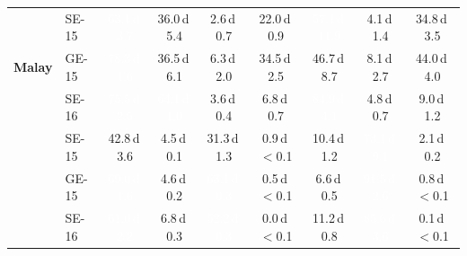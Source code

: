 \begin{table}[!htb]
\begin{tabular}{ll cccc @{\hspace{6pt}} ccc}
\multirow{3}{*}{\textbf{Malay}} & SE-15 & \cellcolor[HTML]{4090C5}\textcolor{white}{63.1\,{\tiny\textsf{d}\,}3.7} & \cellcolor[HTML]{A3CCE3}36.0\,{\tiny\textsf{d}\,}5.4 & \cellcolor[HTML]{F2F8FD}2.6\,{\tiny\textsf{d}\,}0.7 & \cellcolor[HTML]{CCDFF1}22.0\,{\tiny\textsf{d}\,}0.9 & \cellcolor[HTML]{539ECD}\textcolor{white}{57.1\,{\tiny\textsf{d}\,}11.9} & \cellcolor[HTML]{EFF6FC}4.1\,{\tiny\textsf{d}\,}1.4 & \cellcolor[HTML]{A6CEE4}34.8\,{\tiny\textsf{d}\,}3.5 \\
 & GE-15 & \cellcolor[HTML]{1A68AE}\textcolor{white}{78.3\,{\tiny\textsf{d}\,}1.6} & \cellcolor[HTML]{A1CBE2}36.5\,{\tiny\textsf{d}\,}6.1 & \cellcolor[HTML]{EAF3FB}6.3\,{\tiny\textsf{d}\,}2.0 & \cellcolor[HTML]{A8CEE4}34.5\,{\tiny\textsf{d}\,}2.5 & \cellcolor[HTML]{79B5D9}46.7\,{\tiny\textsf{d}\,}8.7 & \cellcolor[HTML]{E7F1FA}8.1\,{\tiny\textsf{d}\,}2.7 & \cellcolor[HTML]{84BCDB}44.0\,{\tiny\textsf{d}\,}4.0 \\
 & SE-16 & \cellcolor[HTML]{206FB4}\textcolor{white}{75.5\,{\tiny\textsf{d}\,}2.5} & \cellcolor[HTML]{3D8DC4}\textcolor{white}{64.1\,{\tiny\textsf{d}\,}1.0} & \cellcolor[HTML]{F0F6FD}3.6\,{\tiny\textsf{d}\,}0.4 & \cellcolor[HTML]{EAF2FB}6.8\,{\tiny\textsf{d}\,}0.7 & \cellcolor[HTML]{0D57A1}\textcolor{white}{84.9\,{\tiny\textsf{d}\,}4.1} & \cellcolor[HTML]{EEF5FC}4.8\,{\tiny\textsf{d}\,}0.7 & \cellcolor[HTML]{E6F0F9}9.0\,{\tiny\textsf{d}\,}1.2 \\
\addlinespace[2pt]
\multirow{3}{*}{\textbf{Chinese}} & SE-15 & \cellcolor[HTML]{89BEDC}42.8\,{\tiny\textsf{d}\,}3.6 & \cellcolor[HTML]{EEF5FC}4.5\,{\tiny\textsf{d}\,}0.1 & \cellcolor[HTML]{B2D2E8}31.3\,{\tiny\textsf{d}\,}1.3 & \cellcolor[HTML]{F5FAFE}0.9\,{\tiny\textsf{d}\,$<$}0.1 & \cellcolor[HTML]{E3EEF8}10.4\,{\tiny\textsf{d}\,}1.2 & \cellcolor[HTML]{2575B7}\textcolor{white}{73.1\,{\tiny\textsf{d}\,}9.1} & \cellcolor[HTML]{F3F8FE}2.1\,{\tiny\textsf{d}\,}0.2 \\
 & GE-15 & \cellcolor[HTML]{3181BD}\textcolor{white}{69.0\,{\tiny\textsf{d}\,}1.6} & \cellcolor[HTML]{EEF5FC}4.6\,{\tiny\textsf{d}\,}0.2 & \cellcolor[HTML]{4090C5}\textcolor{white}{63.1\,{\tiny\textsf{d}\,}0.3} & \cellcolor[HTML]{F6FAFF}0.5\,{\tiny\textsf{d}\,$<$}0.1 & \cellcolor[HTML]{EAF2FB}6.6\,{\tiny\textsf{d}\,}0.5 & \cellcolor[HTML]{08468B}\textcolor{white}{91.5\,{\tiny\textsf{d}\,}2.6} & \cellcolor[HTML]{F6FAFF}0.8\,{\tiny\textsf{d}\,$<$}0.1 \\
 & SE-16 & \cellcolor[HTML]{4695C8}\textcolor{white}{61.0\,{\tiny\textsf{d}\,}2.2} & \cellcolor[HTML]{EAF2FB}6.8\,{\tiny\textsf{d}\,}0.3 & \cellcolor[HTML]{64A9D3}\textcolor{white}{52.2\,{\tiny\textsf{d}\,}0.3} & \cellcolor[HTML]{F7FBFF}0.0\,{\tiny\textsf{d}\,$<$}0.1 & \cellcolor[HTML]{E1EDF8}11.2\,{\tiny\textsf{d}\,}0.8 & \cellcolor[HTML]{0B559F}\textcolor{white}{85.6\,{\tiny\textsf{d}\,}3.6} & \cellcolor[HTML]{F7FBFF}0.1\,{\tiny\textsf{d}\,$<$}0.1 \\

\end{tabular}
\end{table}
